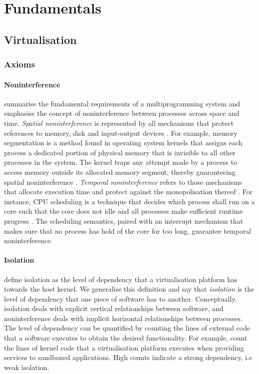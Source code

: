 \chapter{Fundamentals}
\section{Virtualisation}
\subsection{Axioms}
\label{ch:fundamentals/virtualisation/axioms}
\subsubsection{Noninterference}
\label{ch:fundamentals/virtualisation/axioms/noninterference}
\textcite{10.1145/368481.368502} summarise the fundamental requirements of a multiprogramming 
system and emphasise the concept of noninterference between processes across space and time. 
\textit{Spatial noninterference} is represented by all mechanisms that protect references to memory, 
disk and input-output devices \cite{10.1145/368481.368502}. For example, memory segmentation 
is a method found in operating system kernels that assigns each process a dedicated portion
of physical memory that is invisible to all other processes in the system. The kernel traps 
any attempt made by a process to access memory outside its allocated memory segment, thereby 
guaranteeing spatial noninterference \cite{10.5555/2490781}. \textit{Temporal noninterference} refers
to those mechanisms that allocate execution time and protect against the monopolisation thereof 
\cite{10.1145/368481.368502}. For instance, CPU scheduling is a technique that decides which process 
shall run on a core such that the core does not idle and all processes make sufficient 
runtime progress \cite{10.5555/2490781}. The scheduling semantics, paired with an interrupt mechanism 
that makes sure that no process has hold of the core for too long, guarantee temporal noninterference.

\subsubsection{Isolation}
\label{ch:fundamentals/virtualisation/axioms/isolation}
\textcite{10.1145/3381052.3381315} define isolation as the level of dependency that a virtualisation 
platform has towards the host kernel. We generalise this definition and say that \textit{isolation} 
is the level of dependency that one piece of software has to another. Conceptually, isolation 
deals with explicit vertical relationships between software, and noninterference deals with 
implicit horizontal relationships between processes. The level of dependency can be quantified by 
counting the lines of external code that a software executes to obtain the desired functionality. 
For example, \textcite{10.1145/3381052.3381315} count the lines of kernel code 
that a virtualisation platform executes when providing services to sandboxed applications. 
High counts indicate a strong dependency, i.e weak isolation.  

